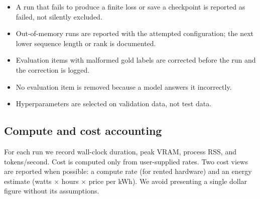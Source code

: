 \begin{itemize}[leftmargin=1.4em]
  \item A run that fails to produce a finite loss or save a checkpoint is
  reported as failed, not silently excluded.
  \item Out-of-memory runs are reported with the attempted configuration; the
  next lower sequence length or rank is documented.
  \item Evaluation items with malformed gold labels are corrected before the run
  and the correction is logged.
  \item No evaluation item is removed because a model answers it incorrectly.
  \item Hyperparameters are selected on validation data, not test data.
\end{itemize}

\subsection{Compute and cost accounting}

For each run we record wall-clock duration, peak VRAM, process RSS, and
tokens/second. Cost is computed only from user-supplied rates. Two cost views are
reported when possible: a compute rate (for rented hardware) and an energy
estimate (watts $\times$ hours $\times$ price per kWh). We avoid presenting a
single dollar figure without its assumptions.
